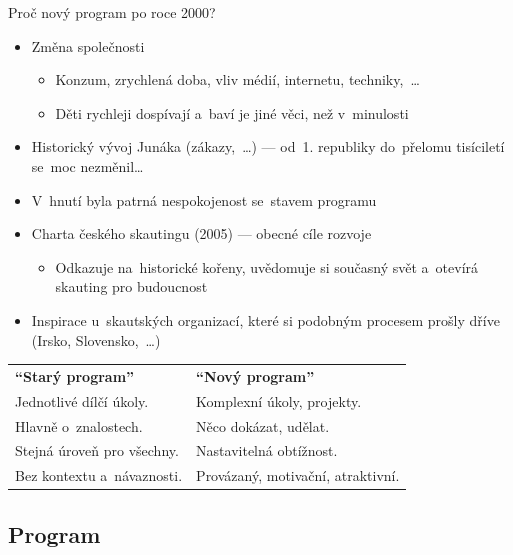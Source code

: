 \documentclass[compress, ucs, xelatex, 11pt, xcolor=dvipsnames, print,
	hyperref={
		bookmarks=true,
		unicode=true,
		colorlinks=true,
		pdftitle={Skautska vychovna metoda},
		plainpages=false,
		pdfauthor={Vojtech Zeisek},
		pdfsubject={Skautska vychovna metoda a jeji vyvoj za posledni stoleti a desetileti},
		pdfcreator={XeLaTeX},
		pdfkeywords={Junak, Pedagogika, Skaut, Skauting, Vychovna metoda},
		linkcolor=Black,
		anchorcolor=Black,
		citecolor=OliveGreen,
		filecolor=OliveGreen,
		menucolor=Black,
		urlcolor=OliveGreen,
		pdftex},
	url={hyphens, lowtilde} %
	]{beamer}
\begin{document}
\begin{frame}{Proč nový program po roce 2000?}
	\begin{itemize}
		\item Změna společnosti
		\begin{itemize}
			\item Konzum, zrychlená doba, vliv médií, internetu, techniky,~\ldots
			\item Děti rychleji dospívají a~baví je jiné věci, než v~minulosti
		\end{itemize}
		\item Historický vývoj Junáka (zákazy,~\ldots) --- od~1. republiky do~přelomu tisíciletí se~moc nezměnil\ldots
		\item V~hnutí byla patrná nespokojenost se~stavem programu
		\item Charta českého skautingu (2005) --- obecné cíle rozvoje
		\begin{itemize}
			\item Odkazuje na~historické kořeny, uvědomuje si současný svět a~otevírá skauting pro budoucnost
		\end{itemize}
		\item Inspirace u~skautských organizací, které si podobným procesem prošly dříve (Irsko, Slovensko,~\ldots)
	\end{itemize}
	\begin{center}
		\begin{tabular}{ll}
			\textbf{\enquote{Starý program}} & \textbf{\enquote{Nový program}}\\
			Jednotlivé dílčí úkoly. & Komplexní úkoly, projekty.\\
			Hlavně o~znalostech. & Něco dokázat, udělat.\\
			Stejná úroveň pro všechny. & Nastavitelná obtížnost.\\
			Bez kontextu a~návaznosti. & Provázaný, motivační, atraktivní.
		\end{tabular}
	\end{center}
\end{frame}

\subsection{Program}
\end{document}

